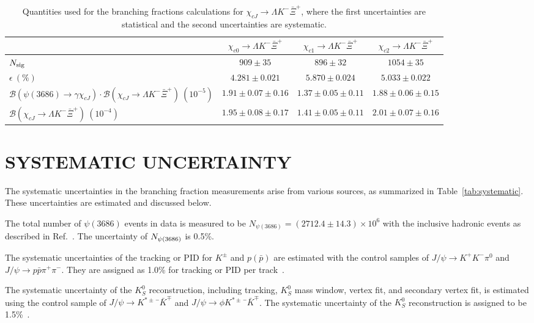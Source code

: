 \documentclass[amsmath,amssymb,twocolumn,prd,floatfix,showpacs,nofootinbib]{revtex4-1}
\begin{document}
	\begin{table}[htbp]
		\caption{Quantities used for  the branching fractions calculations for $\chi_{cJ} \to \Lambda K^-\bar \Xi^+$, where the first uncertainties are statistical and the second uncertainties are systematic.}
		\centering
			\begin{tabular}{lccc}
				\hline\hline
				& $ \chi_{c0} \to \Lambda K^-\bar{\Xi}^+$ & $ \chi_{c1} \to \Lambda K^-\bar{\Xi}^+$ & $ \chi_{c2} \to \Lambda K^-\bar{\Xi}^+ $ \\ 
				\hline 
				$N_{\rm sig}$ & $909\pm35$ & $896\pm32$ & $1054\pm35$ \\ 
				$\epsilon~(\%)$ & $4.281\pm0.021$ & $5.870\pm0.024$ & $5.033\pm0.022$ \\ 
				$\mathcal{B}(\psi(3686)\to \gamma \chi_{cJ})\cdot\mathcal{B}(\chi_{cJ}\to \Lambda K^-\bar \Xi^+)~(10^{-5})$ & $1.91\pm0.07\pm0.16$ & $1.37\pm0.05\pm0.11$ & $1.88\pm0.06\pm0.15$ \\                    
				$\mathcal{B}(\chi_{cJ}\to \Lambda K^-\bar \Xi^+)~(10^{-4})$& $1.95\pm0.08\pm0.17$ & $1.41\pm0.05\pm0.11$ & $2.01\pm0.07\pm0.16$ \\ \hline
				\hline
			\end{tabular}
			\label{tab:BFs_charged}
		\end{table}
		
\section{SYSTEMATIC UNCERTAINTY}

The systematic uncertainties in the branching fraction measurements arise from various sources, as summarized in Table~\ref{tab:systematic}. These uncertainties are estimated and discussed below.

The total number of $\psi(3686)$ events in data is measured to be $N_{\psi(3686)}=(2712.4\pm14.3)\times10^6$ with the inclusive hadronic events as described in Ref.~\cite{ref::psip-num-inc}. The uncertainty of $N_{\rm \psi(3686)}$ is 0.5\%.

The systematic uncertainties of the tracking or PID for $K^{\pm}$ and $p(\bar{p})$ are estimated with the control samples of $J/\psi\to K^{+}K^{-}\pi^0$ and $J/\psi \to p\bar p \pi^+\pi^-$. They are assigned as 1.0\% for tracking or PID per track~\cite{ref::tracking}.

The systematic uncertainty of the $K^0_S$ reconstruction, including tracking, $K^0_S$ mass window, vertex fit, and secondary vertex fit, is estimated using the control sample of $J/\psi \rightarrow K^{*\pm} ¯\bar{K}^\mp$ and $J/\psi \rightarrow \phi K^{*\pm} ¯\bar{K}^\mp$. The systematic uncertainty of the $K^0_S$ reconstruction is assigned to be 1.5\%~\cite{ref::kso}.
\end{document}
